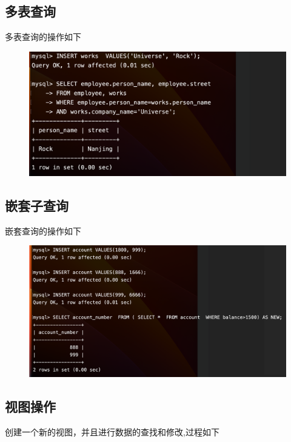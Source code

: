 \documentclass{article}
\begin{document}
\subsection*{多表查询}

多表查询的操作如下

\begin{figure}[H]
    \centering
    \includegraphics[width=1\textwidth]{lab2/10.png}
    \end{figure}

\subsection*{嵌套子查询}


嵌套查询的操作如下

\begin{figure}[H]
    \centering
    \includegraphics[width=1\textwidth]{lab2/11.png}
    \end{figure}


\subsection*{视图操作}

创建一个新的视图，并且进行数据的查找和修改,过程如下
\end{document}
